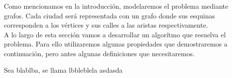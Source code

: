 Como mencionamos en la introducción, modelaremos el problema mediante grafos. Cada ciudad será representada con un grafo donde sus esquinas corresponden a los vértices y sus calles a las aristas respectivamente. \\
A lo largo de esta sección vamos a desarrollar un algorítmo que resuelva el problema. Para ello utilizaremos algunas propiedades que demostraremos a continuación, pero antes algunas definiciones que necesitaremos.

\begin{definition}
Sea blablba, se llama lbbleblela asdasda
\end{definition}
